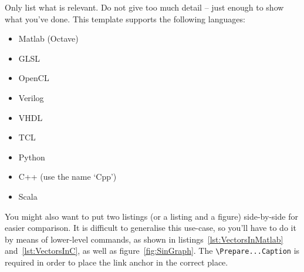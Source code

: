 \begin{minipage}[t]{\textwidth} %
  Only list what is relevant.  Do not give too much detail -- just enough to show what you've done.  This template supports the following languages:

  \vspace{-2ex} %
  \begin{itemize}\setlength{\itemsep}{-1ex} %
    \item Matlab (Octave)
    \item GLSL
    \item OpenCL
    \item Verilog
    \item VHDL
    \item TCL
    \item Python
    \item C++ (use the name `Cpp')
    \item Scala
  \end{itemize}
\end{minipage}

You might also want to put two listings (or a listing and a figure) side-by-side for easier comparison.  It is difficult to generalise this use-case, so you'll have to do it by means of lower-level commands, as shown in listings~\ref{lst:VectorsInMatlab} and~\ref{lst:VectorsInC}, as well as figure~\ref{fig:SinGraph}.  The \verb|\Prepare...Caption| is required in order to place the link anchor in the correct place.

